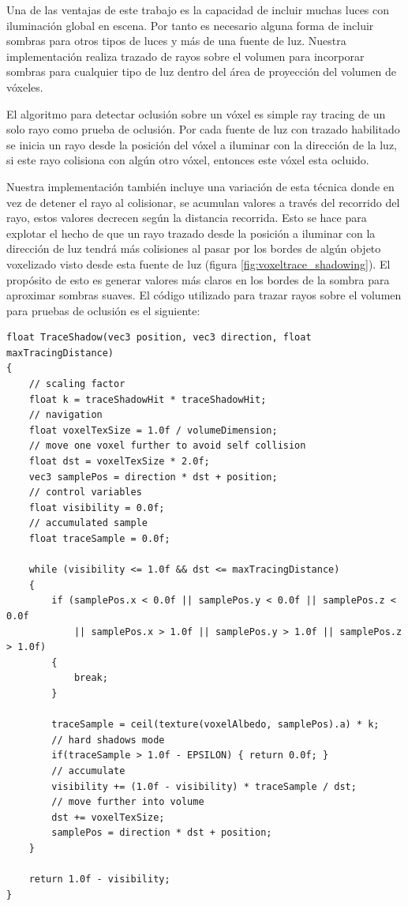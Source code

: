 Una de las ventajas de este trabajo es la capacidad de incluir muchas luces con iluminación global en escena. Por tanto es necesario alguna forma de incluir sombras para otros tipos de luces y más de una fuente de luz. Nuestra implementación realiza trazado de rayos sobre el volumen para incorporar sombras para cualquier tipo de luz dentro del área de proyección del volumen de vóxeles.

El algoritmo para detectar oclusión sobre un vóxel es simple ray tracing de un solo rayo como prueba de oclusión. Por cada fuente de luz con trazado habilitado se inicia un rayo desde la posición del vóxel a iluminar con la dirección de la luz, si este rayo colisiona con algún otro vóxel, entonces este vóxel esta ocluido.

Nuestra implementación también incluye una variación de esta técnica donde en vez de detener el rayo al colisionar, se acumulan valores a través del recorrido del rayo, estos valores decrecen según la distancia recorrida. Esto se hace para explotar el hecho de que un rayo trazado desde la posición a iluminar con la dirección de luz tendrá más colisiones al pasar por los bordes de algún objeto voxelizado visto desde esta fuente de luz (figura \ref{fig:voxeltrace_shadowing}). El propósito de esto es generar valores más claros en los bordes de la sombra para aproximar sombras suaves. El código utilizado para trazar rayos sobre el volumen para pruebas de oclusión es el siguiente:
\\
\begin{lstlisting}[caption={Trazado de rayos sobre el volumen albedo resultado del proceso de voxelización para sombras sobre vóxeles}, label=Shadow1]
float TraceShadow(vec3 position, vec3 direction, float maxTracingDistance) 
{
    // scaling factor
    float k = traceShadowHit * traceShadowHit;
    // navigation
    float voxelTexSize = 1.0f / volumeDimension;
    // move one voxel further to avoid self collision
    float dst = voxelTexSize * 2.0f;
    vec3 samplePos = direction * dst + position;
    // control variables
    float visibility = 0.0f;
    // accumulated sample
    float traceSample = 0.0f;

    while (visibility <= 1.0f && dst <= maxTracingDistance) 
    {
        if (samplePos.x < 0.0f || samplePos.y < 0.0f || samplePos.z < 0.0f
            || samplePos.x > 1.0f || samplePos.y > 1.0f || samplePos.z > 1.0f) 
        { 
            break; 
        }
        
        traceSample = ceil(texture(voxelAlbedo, samplePos).a) * k;
        // hard shadows mode
        if(traceSample > 1.0f - EPSILON) { return 0.0f; }
        // accumulate
        visibility += (1.0f - visibility) * traceSample / dst;
        // move further into volume
        dst += voxelTexSize;
        samplePos = direction * dst + position;
    }

    return 1.0f - visibility;
}
\end{lstlisting}

